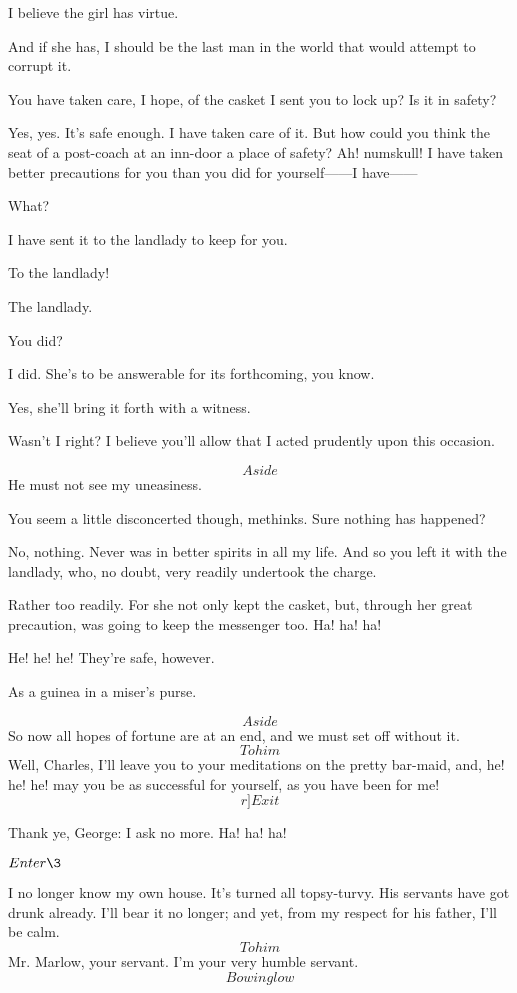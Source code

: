 \documentclass{book}
\begin{document}
\4  I believe the girl has virtue.

\2  And if she has, I should be the last man in the world that
would attempt to corrupt it.

\4  You have taken care, I hope, of the casket I sent you to
lock up?  Is it in safety?

\2  Yes, yes.  It's safe enough.  I have taken care of it.  But
how could you think the seat of a post-coach at an inn-door a place of
safety?  Ah! numskull!  I have taken better precautions for you than
you did for yourself------I have------

\4  What?

\2  I have sent it to the landlady to keep for you.

\4  To the landlady!

\2  The landlady.

\4  You did?

\2  I did.  She's to be answerable for its forthcoming, you know.

\4  Yes, she'll bring it forth with a witness.

\2  Wasn't I right?  I believe you'll allow that I acted
prudently upon this occasion.

\4  \[Aside\]  He must not see my uneasiness.

\2  You seem a little disconcerted though, methinks.  Sure
nothing has happened?

\4  No, nothing.  Never was in better spirits in all my life. 
And so you left it with the landlady, who, no doubt, very readily
undertook the charge.

\2  Rather too readily.  For she not only kept the casket, but,
through her great precaution, was going to keep the messenger too.  Ha!
ha! ha!

\4  He! he! he!  They're safe, however.

\2  As a guinea in a miser's purse.

\4  \[Aside\]  So now all hopes of fortune are at an end, and we
must set off without it.  \[To him\]  Well, Charles, I'll leave you to
your meditations on the pretty bar-maid, and, he! he! he! may you be as
successful for yourself, as you have been for me!  \[r]Exit\]

\2  Thank ye, George: I ask no more.  Ha! ha! ha!


\(Enter \3\)


\3  I no longer know my own house.  It's turned all
topsy-turvy.  His servants have got drunk already.  I'll bear it no
longer; and yet, from my respect for his father, I'll be calm.  \[To
him\]  Mr. Marlow, your servant.  I'm your very humble servant. 
\[Bowing low\]
\end{document}
